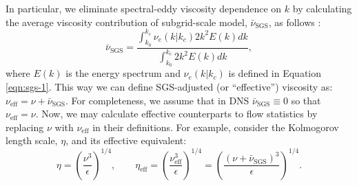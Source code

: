 \documentclass{pracamgren}
\begin{document}
In particular, we eliminate spectral-eddy viscosity dependence on $k$ by calculating the average viscosity contribution of subgrid-scale model, $\bar{\nu}_{\text{SGS}}$, as follows \parencite[Equation 13 therein]{Jin2010}:
\begin{equation}
\bar{\nu}_{\text{SGS}} =
\frac
{\int_{k_0}^{k_c} \nu_{e}(k|k_c) 2 k^2 E(k) dk}
{\int_{k_0}^{k_c} 2 k^2 E(k) dk} ,
\label{egn:rnu-sgs}
\end{equation}
where $E(k)$ is the energy spectrum and $\nu_{e}(k|k_c)$ is defined in Equation \ref{eqn:sgs-1}.
This way we can define SGS-adjusted (or ``effective'') viscosity as: $\nu_{\text{eff}} = \nu + \bar{\nu}_{\text{SGS}}$.
For completeness, we assume that in DNS $\bar{\nu}_{\text{SGS}} \equiv 0$ so that $\nu_{\text{eff}} = \nu$.
Now, we may calculate effective counterparts to flow statistics by replacing $\nu$ with $\nu_{\text{eff}}$ in their definitions.
For example, consider the Kolmogorov length scale, $\eta$, and its effective equivalent:
$$
\eta = \left( \frac{\nu^3}{\epsilon} \right)^{1/4} , \quad \quad \eta_{\text{eff}} = \left( \frac{\nu_{\text{eff}}^3}{\epsilon} \right)^{1/4} = \left( \frac{(\nu + \bar{\nu}_{\text{SGS}})^3}{\epsilon} \right)^{1/4} .
$$
\end{document}
